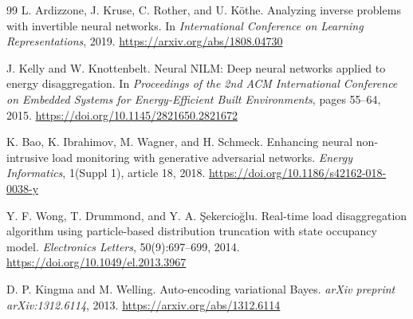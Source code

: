 \documentclass[11pt]{article}
\begin{document}
\begin{thebibliography}{99}
L. Ardizzone, J. Kruse, C. Rother, and U. K\"othe.
\newblock Analyzing inverse problems with invertible neural networks.
\newblock In \emph{International Conference on Learning Representations}, 2019.
\newblock \url{https://arxiv.org/abs/1808.04730}

J. Kelly and W. Knottenbelt.
\newblock Neural NILM: Deep neural networks applied to energy disaggregation.
\newblock In \emph{Proceedings of the 2nd ACM International Conference on Embedded Systems for Energy-Efficient Built Environments}, pages 55--64, 2015.
\newblock \url{https://doi.org/10.1145/2821650.2821672}

K. Bao, K. Ibrahimov, M. Wagner, and H. Schmeck.
\newblock Enhancing neural non-intrusive load monitoring with generative adversarial networks.
\newblock \emph{Energy Informatics}, 1(Suppl 1), article 18, 2018.
\newblock \url{https://doi.org/10.1186/s42162-018-0038-y}

Y. F. Wong, T. Drummond, and Y. A. \c{S}ekercio\u{g}lu.
\newblock Real-time load disaggregation algorithm using particle-based distribution truncation with state occupancy model.
\newblock \emph{Electronics Letters}, 50(9):697--699, 2014.
\newblock \url{https://doi.org/10.1049/el.2013.3967}

D. P. Kingma and M. Welling.
\newblock Auto-encoding variational Bayes.
\newblock \emph{arXiv preprint arXiv:1312.6114}, 2013.
\newblock \url{https://arxiv.org/abs/1312.6114}
\end{thebibliography}
\end{document}
